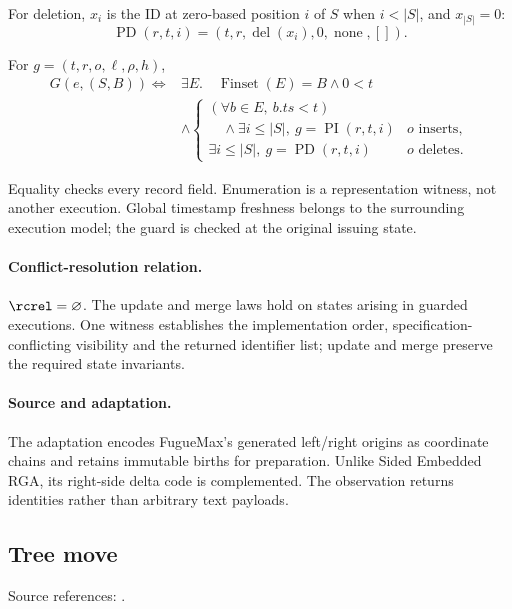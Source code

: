 For deletion, $x_i$ is the ID at zero-based position $i$ of $S$ when $i<|S|$, and $x_{|S|}=0$:
\[
\operatorname{PD}(r,t,i)=(t,r,\operatorname{del}(x_i),0,\operatorname{none},[]).
\]

For $g=(t,r,o,\ell,\rho,h)$,
\[
\begin{aligned}
G(e,(S,B))\iff{}&\exists E.\quad
 \operatorname{Finset}(E)=B\land 0<t\\
&\land\begin{cases}
(\forall b\in E,\ b.ts<t)\\
\quad\land\exists i\le |S|,\ g=\operatorname{PI}(r,t,i)&o\text{ inserts},\\
\exists i\le |S|,\ g=\operatorname{PD}(r,t,i)&o\text{ deletes}.
\end{cases}
\end{aligned}
\]

Equality checks every record field. Enumeration is a representation witness, not another execution. Global timestamp freshness belongs to the surrounding execution model; the guard is checked at the original issuing state.


\paragraph{Conflict-resolution relation.}
$\rcrel=\varnothing$. The update and merge laws hold on states arising in guarded executions. One witness establishes the implementation order, specification-conflicting visibility and the returned identifier list; update and merge preserve the required state invariants.


\paragraph{Source and adaptation.}
The adaptation encodes FugueMax's generated left/right origins as coordinate chains and retains immutable births for preparation. Unlike Sided Embedded RGA, its right-side delta code is complemented. The observation returns identities rather than arbitrary text payloads.


\subsection{Tree move}
\label{app:dt-tree-move}

\noindent Source references: \cite{TreeMove}.


